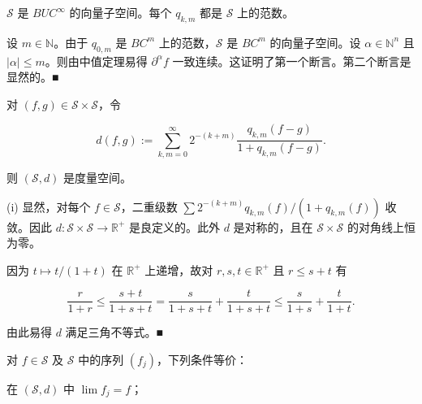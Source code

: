 \begin{remark}

\begin{items}
\item

$ \mathcal{S} $ 是 $ BUC^{\infty} $ 的向量子空间。每个 $ q_{k,m} $ 都是 $ \mathcal{S} $ 上的范数。

\proofhead
设 $ m \in \mathbb{N} $。由于 $ q_{0,m} $ 是 $ BC^m $ 上的范数，$ \mathcal{S} $ 是 $ BC^m $ 的向量子空间。设 $ \alpha \in \mathbb{N}^n $ 且 $ |\alpha| \le m $。则由中值定理易得 $ \partial^{\alpha}f $ 一致连续。这证明了第一个断言。第二个断言是显然的。\nobreak\hspace{0.35em}■
\item

对 $ (f,g) \in \mathcal{S}\times\mathcal{S} $，令

\[
d(f,g) := \sum_{k,m=0}^{\infty} 2^{-(k+m)}\frac{q_{k,m}(f-g)}{1+q_{k,m}(f-g)} .
\]

则 $ (\mathcal{S},d) $ 是度量空间。

\begin{subitems}
\item

\proofhead
(i) 显然，对每个 $ f \in \mathcal{S} $，二重级数 $ \sum 2^{-(k+m)}q_{k,m}(f)/(1+q_{k,m}(f)) $ 收敛。因此 $ d: \mathcal{S}\times\mathcal{S} \to \mathbb{R}^+ $ 是良定义的。此外 $ d $ 是对称的，且在 $ \mathcal{S}\times\mathcal{S} $ 的对角线上恒为零。
\item

因为 $ t \mapsto t/(1+t) $ 在 $ \mathbb{R}^+ $ 上递增，故对 $ r,s,t \in \mathbb{R}^+ $ 且 $ r \le s+t $ 有

\[
\frac{r}{1+r} \le \frac{s+t}{1+s+t} = \frac{s}{1+s+t} + \frac{t}{1+s+t} \le \frac{s}{1+s} + \frac{t}{1+t} .
\]

由此易得 $ d $ 满足三角不等式。\nobreak\hspace{0.35em}■

\end{subitems}

\item

对 $ f \in \mathcal{S} $ 及 $ \mathcal{S} $ 中的序列 $ (f_j) $，下列条件等价：

\begin{subitems}
\item

在 $ (\mathcal{S},d) $ 中 $ \lim f_j = f $；

\item


\end{subitems}
\end{items}
\end{remark}
